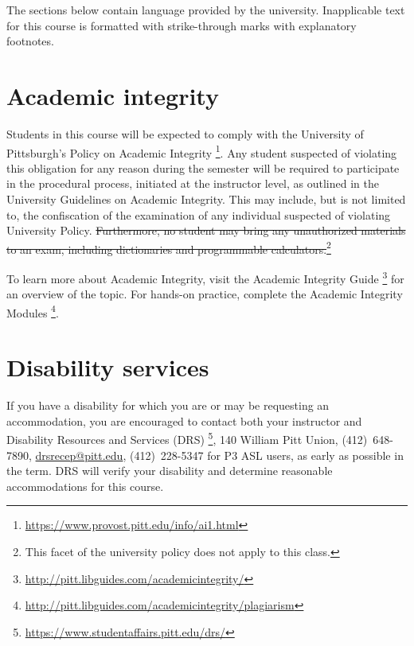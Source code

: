 \documentclass[12pt]{article}
\begin{document}
\begin{notebox}
  The sections below contain language provided by the university.
  Inapplicable text for this course is formatted with strike-through marks %
  with explanatory footnotes.
\end{notebox}

\section{Academic integrity}

Students in this course %
will be expected to comply with %
the University of Pittsburgh's %
Policy on Academic Integrity%
\footnote{\url{https://www.provost.pitt.edu/info/ai1.html}}.
%
Any student suspected of violating this obligation %
for any reason during the semester %
will be required to participate in the procedural process, %
initiated at the instructor level, %
as outlined in the University Guidelines on Academic Integrity.
%
This may include, %
but is not limited to, %
the confiscation of the examination %
of any individual suspected of violating University Policy.
%
\st{Furthermore, %
no student may bring any unauthorized materials to an exam, %
including dictionaries and programmable calculators.}\footnote{%
This facet of the university policy does not apply to this class.}

To learn more about Academic Integrity, %
visit the Academic Integrity Guide%
\footnote{\url{http://pitt.libguides.com/academicintegrity/}} %
for an overview of the topic.
%
For hands-on practice, %
complete the Academic Integrity Modules%
\footnote{\url{http://pitt.libguides.com/academicintegrity/plagiarism}}.

\section{Disability services}

If you have a disability %
for which you are or may be requesting an accommodation, %
you are encouraged to contact %
both your instructor and Disability Resources and Services (DRS)%
\footnote{\url{https://www.studentaffairs.pitt.edu/drs/}}, %
140 William Pitt Union, %
(412)~648-7890, %
\href{mailto:drsrecep@pitt.edu}{drsrecep@pitt.edu}, %
(412)~228-5347 for P3 ASL users, %
as early as possible in the term.
%
DRS will verify your disability %
and determine reasonable accommodations for this course.

\label{mylastpage}              %
\newpage
\appendix
\setcounter{page}{1}
\renewcommand{\thepage}{\arabic{page}}
\fancyhead[r]{Appendix Page \thepage{} of~\pageref*{mylastappendixpage}}
\printbibliography[heading=none]{}%
\label{mylastappendixpage}
\end{document}
